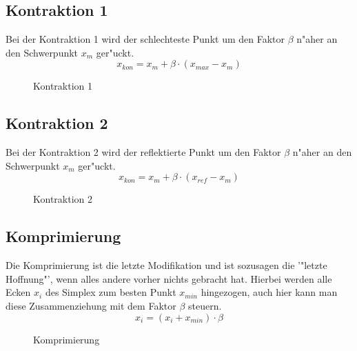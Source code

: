 \subsection{Kontraktion 1}
Bei der Kontraktion 1 wird der schlechteste Punkt um den Faktor $\beta$ n"aher an den Schwerpunkt $x_m$ ger"uckt. 
\begin{equation}
x_{kon} = x_{m} + \beta \cdot (x_{max}-x_{m})
\end{equation}

\begin{figure}[h]
	\centering
  	\caption{Kontraktion 1}%
	\label{fig:Kon1}%
\end{figure}

\subsection{Kontraktion 2}
Bei der Kontraktion 2 wird der reflektierte Punkt um den Faktor $\beta$ n"aher an den Schwerpunkt $x_m$ ger"uckt. 
\begin{equation}
x_{kon} = x_{m} + \beta \cdot (x_{ref}-x_{m})
\end{equation}

\begin{figure}[h]
	\centering
  	\caption{Kontraktion 2}%
	\label{fig:Kon2}%
\end{figure}
\newpage
\subsection{Komprimierung}
Die Komprimierung ist die letzte Modifikation und ist sozusagen die '"letzte Hoffnung"', wenn alles andere vorher nichts gebracht hat. Hierbei werden alle Ecken $x_i$ des Simplex zum besten Punkt $x_{min}$ hingezogen, auch hier kann man diese Zusammenziehung mit dem Faktor $\beta$ steuern.  
\begin{equation}
x_{i} = (x_i + x_{min}) \cdot \beta
\end{equation}

\begin{figure}[h]
	\centering
  	\caption{Komprimierung}%
	\label{fig:komp}%
\end{figure}
